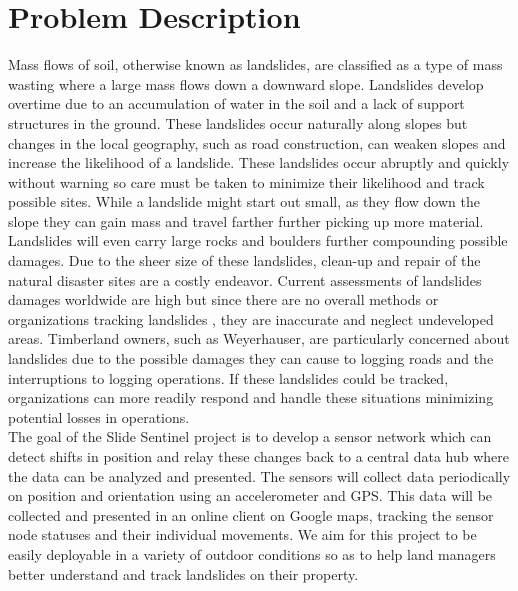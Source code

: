 \documentclass[draftclsnofoot,onecolumn, 10pt]{IEEEtran}
\begin{document}
	\section{Problem Description}
	Mass flows of soil, otherwise known as landslides, are classified as a type of mass wasting where a large mass flows down a downward slope. Landslides develop overtime due to an accumulation of water in the soil and a lack of support structures in the ground. These landslides occur naturally along slopes but changes in the local geography, such as road construction, can weaken slopes and increase the likelihood of a landslide. These landslides occur abruptly and quickly without warning so care must be taken to minimize their likelihood and track possible sites. While a landslide might start out small, as they flow down the slope they can gain mass and travel farther further picking up more material. Landslides will even carry large rocks and boulders further compounding possible damages. Due to the sheer size of these landslides, clean-up and repair of the natural disaster sites are a costly endeavor. Current assessments of landslides damages worldwide are high but since there are no overall methods or organizations tracking landslides , they are inaccurate and neglect undeveloped areas. Timberland owners, such as Weyerhauser, are particularly concerned about landslides due to the possible damages they can cause to logging roads and the interruptions to logging operations. If these landslides could be tracked, organizations can more readily respond and handle these situations minimizing potential losses in operations. \\
	The goal of the Slide Sentinel project is to develop a sensor network which can detect shifts in position and relay these changes back to a central data hub where the data can be analyzed and presented. The sensors will collect data periodically on position and orientation using an accelerometer and GPS. This data will be collected and presented in an online client on Google maps, tracking the sensor node statuses and their individual movements. We aim for this project to be easily deployable in a variety of outdoor conditions so as to help land managers better understand and track landslides on their property.
	
\end{document}
